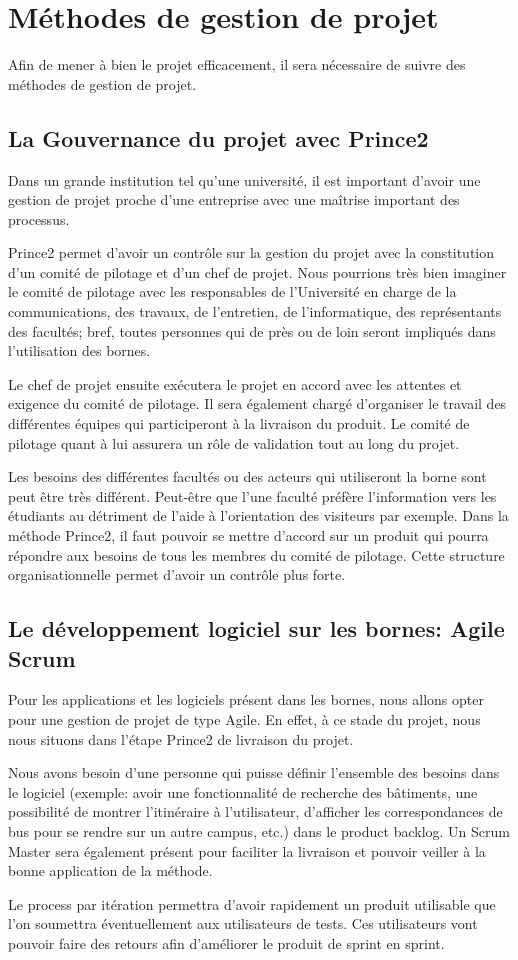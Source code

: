 \chapter{Méthodes de gestion de projet}
Afin de mener à bien le projet efficacement, il sera nécessaire de suivre des méthodes de gestion de projet.
\section{La Gouvernance du projet avec Prince2}
Dans un grande institution tel qu'une université, il est important d'avoir une gestion de projet proche d'une entreprise avec une maîtrise important des processus.

Prince2 permet d'avoir un contrôle sur la gestion du projet avec la constitution d'un comité de pilotage et d'un chef de projet. Nous pourrions très bien imaginer le comité de pilotage avec les responsables de l'Université en charge de la communications, des travaux, de l'entretien, de l'informatique, des représentants des facultés; bref, toutes personnes qui de près ou de loin seront impliqués dans l'utilisation des bornes. 

Le chef de projet ensuite exécutera le projet en accord avec les attentes et exigence du comité de pilotage. Il sera également chargé d'organiser le travail des différentes équipes qui participeront à la livraison du produit. Le comité de pilotage quant à lui assurera un rôle de validation tout au long du projet. 

Les besoins des différentes facultés ou des acteurs qui utiliseront la borne sont peut être très différent. Peut-être que l'une faculté préfère l'information vers les étudiants au détriment de l'aide à l'orientation des visiteurs par exemple. Dans la méthode Prince2, il faut pouvoir se mettre d'accord sur un produit qui pourra répondre aux besoins de tous les membres du comité de pilotage. Cette structure organisationnelle permet d'avoir un contrôle plus forte. 

\section{Le développement logiciel sur les bornes: Agile Scrum}
Pour les applications et les logiciels présent dans les bornes, nous allons opter pour une gestion de projet de type Agile. En effet, à ce stade du projet, nous nous situons dans l'étape Prince2 de livraison du projet. 

Nous avons besoin d'une personne qui puisse définir l'ensemble des besoins dans le logiciel (exemple: avoir une fonctionnalité de recherche des bâtiments, une possibilité de montrer l'itinéraire à l'utilisateur, d'afficher les correspondances de bus pour se rendre sur un autre campus, etc.) dans le product backlog. Un Scrum Master sera également présent pour faciliter la livraison et pouvoir veiller à la bonne application de la méthode. 

Le process par itération permettra d'avoir rapidement un produit utilisable que l'on soumettra éventuellement aux utilisateurs de tests. Ces utilisateurs vont pouvoir faire des retours afin d'améliorer le produit de sprint en sprint. 